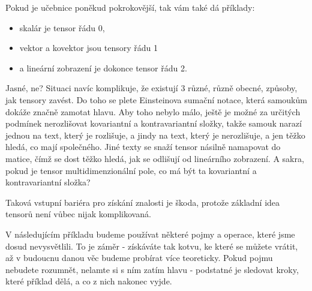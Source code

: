 \documentclass[a5paper,12pt]{amsbook}
\theoremstyle{definition}
\begin{document}
Pokud je učebnice poněkud pokrokovější, tak vám také dá příklady:
\begin{itemize}
  \item skalár je tensor řádu 0,
  \item vektor a kovektor jsou tensory řádu 1
  \item a lineární zobrazení je dokonce tensor řádu 2.
\end{itemize}

\noindent
Jasné, ne? Situaci navíc komplikuje, že existují 3 různé, různě obecné, způsoby,
jak tensory zavést. Do toho se plete Einsteinova sumační notace, která samoukům
dokáže značně zamotat hlavu. Aby toho nebylo málo, ještě je možné za určitých podmínek
nerozlišovat kovariantní a kontravariantní složky, takže samouk narazí jednou na text,
který je rozlišuje, a jindy na text, který je nerozlišuje, a jen těžko hledá, co mají
společného. Jiné texty se snaží tensor násilně namapovat do matice, čímž se dost těžko
hledá, jak se odlišují od lineárního zobrazení. A sakra, pokud je tensor multidimenzionální
pole, co má být ta kovariantní a kontravariantní složka?

Taková vstupní bariéra pro získání znalosti je škoda, protože základní idea tensorů není
vůbec nijak komplikovaná.

V následujícím příkladu budeme používat některé pojmy a operace,
které jsme dosud nevysvětlili. To je záměr - získáváte tak kotvu, ke které se můžete
vrátit, až v budoucnu danou věc budeme probírat více teoreticky. Pokud pojmu nebudete
rozumnět, nelamte si s ním zatím hlavu - podstatné je sledovat kroky, které
příklad dělá, a co z nich nakonec vyjde.
\end{document}
